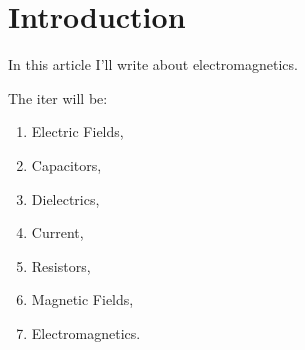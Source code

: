 \documentclass{article}
\begin{document}
\section{Introduction} 
  In this article I'll write about electromagnetics.

  The iter will be:
\begin{enumerate}   
  \item Electric Fields,   
  \item Capacitors,   
  \item Dielectrics,    
  \item Current,   
  \item Resistors,   
  \item Magnetic Fields,   
  \item Electromagnetics.  
\end{enumerate}
\newpage{}
\end{document}
